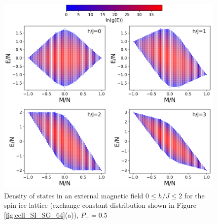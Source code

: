 \documentclass[preprint,12pt]{elsarticle}
\begin{document}
\begin{figure}[H]
	\centering
	\includegraphics[width=1\linewidth]{pictures/HDOS_SI_64_J0_1.png}
	\caption{Density of states in an external magnetic field $0\leq h/J \leq 2$ for the spin ice lattice (exchange constant distribution shown in Figure \ref{fig:cell_SI_SG_64}(a)), $P_+ = 0.5$}
	\label{fig:HDOS_ice_1}
\end{figure}
\end{document}
